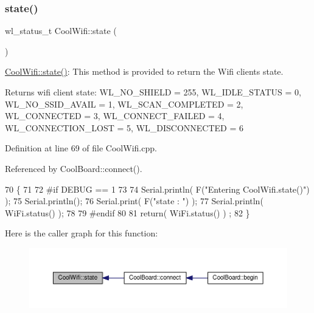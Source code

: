 \subsubsection{\texorpdfstring{state()}{state()}}
{\footnotesize\ttfamily wl\+\_\+status\+\_\+t Cool\+Wifi\+::state (\begin{DoxyParamCaption}{ }\end{DoxyParamCaption})}

\hyperlink{classCoolWifi_a1c7b4d82a4098d346e7593dce92039fa}{Cool\+Wifi\+::state()}\+: This method is provided to return the Wifi client\textquotesingle{}s state. \begin{DoxyReturn}{Returns}
wifi client state\+: W\+L\+\_\+\+N\+O\+\_\+\+S\+H\+I\+E\+LD = 255, W\+L\+\_\+\+I\+D\+L\+E\+\_\+\+S\+T\+A\+T\+US = 0, W\+L\+\_\+\+N\+O\+\_\+\+S\+S\+I\+D\+\_\+\+A\+V\+A\+IL = 1, W\+L\+\_\+\+S\+C\+A\+N\+\_\+\+C\+O\+M\+P\+L\+E\+T\+ED = 2, W\+L\+\_\+\+C\+O\+N\+N\+E\+C\+T\+ED = 3, W\+L\+\_\+\+C\+O\+N\+N\+E\+C\+T\+\_\+\+F\+A\+I\+L\+ED = 4, W\+L\+\_\+\+C\+O\+N\+N\+E\+C\+T\+I\+O\+N\+\_\+\+L\+O\+ST = 5, W\+L\+\_\+\+D\+I\+S\+C\+O\+N\+N\+E\+C\+T\+ED = 6 
\end{DoxyReturn}


Definition at line 69 of file Cool\+Wifi.\+cpp.



Referenced by Cool\+Board\+::connect().


\begin{DoxyCode}
70 \{
71 
72 \textcolor{preprocessor}{#if DEBUG == 1 }
73 
74     Serial.println( F(\textcolor{stringliteral}{"Entering CoolWifi.state()"}) );
75     Serial.println();   
76     Serial.print( F(\textcolor{stringliteral}{"state : "}) );
77     Serial.println( WiFi.status() );
78 
79 \textcolor{preprocessor}{#endif}
80     
81     \textcolor{keywordflow}{return}( WiFi.status() ) ;
82 \}
\end{DoxyCode}
Here is the caller graph for this function\+:
\nopagebreak
\begin{figure}[H]
\begin{center}
\leavevmode
\includegraphics[width=350pt]{classCoolWifi_a1c7b4d82a4098d346e7593dce92039fa_icgraph}
\end{center}
\end{figure}


